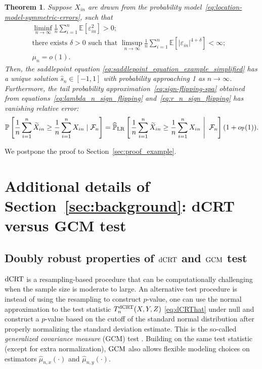 \documentclass[12pt]{article}
\newtheorem{theorem}{Theorem}
\theoremstyle{definition}
\def\P{\mathbb{P}}
\def\P{\mathbb{P}}
\newcommand{\E}{\mathbb E}								%
\renewcommand{\P}{\mathbb{P}}							%
\newcommand{\srx}{X}									%
\newcommand{\srz}{Z}									%
\newcommand{\sry}{Y}									%
\newcommand{\dCRT}{\textnormal{dCRT}} 					%
\newcommand{\GCM}{\textnormal{GCM}}						%
\begin{document}
\begin{theorem}\label{thm:example}
Suppose $X_{in}$ are drawn from the probability model~\eqref{eq:location-model-symmetric-errors}, such that
	\begin{align}
		\liminf_{n\rightarrow\infty}\frac{1}{n}\sum_{i=1}^n \E[\varepsilon_{in}^2]>0;&\label{eq:lower_bound_second_moment} \\
		\text{there exists $\delta>0$ such that }\limsup_{n\rightarrow\infty}\frac{1}{n}\sum_{i=1}^n\E[|\varepsilon_{in}|^{4+\delta}]<\infty;&\label{eq:upper_bound_four_delta_moment} \\
		\mu_n=o(1).&\label{eq:mu_n_convergence}
	\end{align}
	Then, the saddlepoint equation \eqref{eq:saddlepoint_equation_example_simplified} has a unique solution $\hat s_n\in [-1,1]$ with probability approaching 1 as $n\rightarrow \infty$. Furthermore, the tail probability approximation~\eqref{eq:sign-flipping-spa} obtained from equations~\eqref{eq:lambda_n_sign_flipping} and~\eqref{eq:r_n_sign_flipping} has vanishing relative error:
	\small
	\begin{align}\label{eq:conclusion_example}
	\P\left[\frac{1}{n}\sum_{i=1}^n \widetilde{X}_{in}\geq \frac{1}{n}\sum_{i=1}^n X_{in}\mid \mathcal{F}_n\right]=\widehat{\P}_{\textnormal{LR}}\left[\left.\frac{1}{n}\sum_{i=1}^n \widetilde{X}_{in} \geq \frac{1}{n}\sum_{i=1}^n X_{in}\ \right|\ \mathcal{F}_n\right](1+o_{\P}(1)).
	\end{align}
	\normalsize
\end{theorem}
\noindent 
We postpone the proof to Section~\ref{sec:proof_example}.



\section{Additional details of Section~\ref{sec:background}: dCRT versus GCM test}\label{sec:additional-details-background}

\subsection{Doubly robust properties of $\dCRT$ and $\GCM$ test}\label{sec:double-robustness}


$\dCRT$ is a resampling-based procedure that can be computationally challenging when the sample size is moderate to large. An alternative test procedure is instead of using the resampling to construct $p$-value, one can use the normal approximation to the test statistic $T_n^{\dCRT}(\srx, \sry, \srz)$ \eqref{eq:dCRThat} under null and construct a $p$-value based on the cutoff of the standard normal distribution after properly normalizing the standard deviation estimate. This is the so-called \textit{generalized covariance measure} (GCM) test \citep{Shah2018}. Building on the same test statistic (except for extra normalization), $\GCM$ also allows flexible modeling choices on estimators $\widehat{\mu}_{n,x}(\cdot)$ and $\widehat{\mu}_{n,y}(\cdot)$. 
\end{document}
